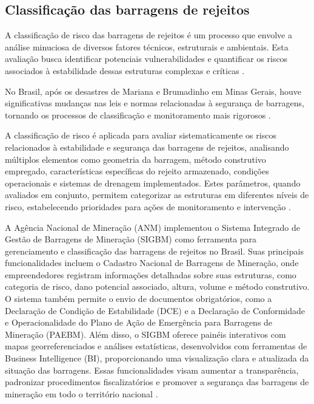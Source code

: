 \subsection{Classificação das barragens de rejeitos}

A classificação de risco das barragens de rejeitos é um processo que envolve a análise minuciosa de diversos fatores técnicos, estruturais e ambientais. Esta avaliação busca identificar potenciais vulnerabilidades e quantificar os riscos associados à estabilidade dessas estruturas complexas e críticas \cite{cruz2024}.

No Brasil, após os desastres de Mariana e Brumadinho em Minas Gerais, houve significativas mudanças nas leis e normas relacionadas à segurança de barragens, tornando os processos de classificação e monitoramento mais rigorosos \cite{geoscan2020}.

A classificação de risco é aplicada para avaliar sistematicamente os riscos relacionados à estabilidade e segurança das barragens de rejeitos, analisando múltiplos elementos como geometria da barragem, método construtivo empregado, características específicas do rejeito armazenado, condições operacionais e sistemas de drenagem implementados. Estes parâmetros, quando avaliados em conjunto, permitem categorizar as estruturas em diferentes níveis de risco, estabelecendo prioridades para ações de monitoramento e intervenção \cite{cruz2024}.

A Agência Nacional de Mineração (ANM) implementou o Sistema Integrado de Gestão de Barragens de Mineração (SIGBM) como ferramenta para gerenciamento e classificação das barragens de rejeitos no Brasil. Suas principais funcionalidades incluem o Cadastro Nacional de Barragens de Mineração, onde empreendedores registram informações detalhadas sobre suas estruturas, como categoria de risco, dano potencial associado, altura, volume e método construtivo. O sistema também permite o envio de documentos obrigatórios, como a Declaração de Condição de Estabilidade (DCE) e a Declaração de Conformidade e Operacionalidade do Plano de Ação de Emergência para Barragens de Mineração (PAEBM). Além disso, o SIGBM oferece painéis interativos com mapas georreferenciados e análises estatísticas, desenvolvidos com ferramentas de Business Intelligence (BI), proporcionando uma visualização clara e atualizada da situação das barragens. Essas funcionalidades visam aumentar a transparência, padronizar procedimentos fiscalizatórios e promover a segurança das barragens de mineração em todo o território nacional \cite{anmsistema2020}.

